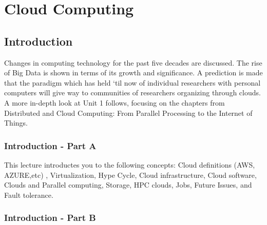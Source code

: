 \chapter{Cloud Computing}
\label{sec:icloud-fundamentals}

\FILENAME

\section{Introduction}

Changes in computing technology for the past five decades are discussed.
The rise of Big Data is shown in terms of its growth and significance. A
prediction is made that the paradigm which has held `til now of
individual researchers with personal computers will give way to
communities of researchers organizing through clouds. A more in-depth
look at Unit 1 follows, focusing on the chapters from Distributed and
Cloud Computing: From Parallel Processing to the Internet of Things.

%


\subsection{Introduction - Part A}\label{s:cloud-fundamentals-a}


This lecture introductes you to the following concepts: Cloud
definitions (AWS, AZURE,etc) , Virtualization, Hype Cycle, Cloud
infrastructure, Cloud software, Clouds and Parallel computing,
Storage, HPC clouds, Jobs, Future Issues, and Fault tolerance.

\subsection{Introduction - Part B}\label{s:cloud-fundamentals-b}


